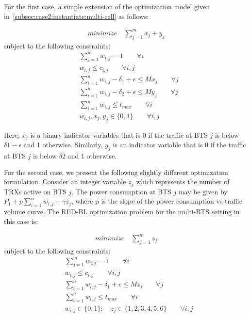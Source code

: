 For the first case, a simple extension of the optimization model given in~\ref{subsec:case2:instantiate:multi-cell} as follows:

\begin{align}
\textit{minimize} \quad \sum_{j=1}^{m} x_j + y_j
\end{align}
subject to the following constraints:
\begin{align}
& \sum_{j=1}^m w_{i,j} = 1 \qquad \forall i \\
& w_{i,j} \leq c_{i,j} \qquad \forall i, j \\
& \sum_{i=1}^nw_{i,j}-\delta_1 +\epsilon \leq Mx_j \qquad \forall j \\
& \sum_{i=1}^nw_{i,j}-\delta_2 +\epsilon \leq My_j \qquad \forall j \\
& \sum_{i=1}^n w_{i,j} \le t_{max} \qquad \forall i \\
& w_{i,j}, x_j, y_j \in \{0,1\} \qquad \forall i, j%
\end{align}

Here, $x_j$ is a binary indicator variables that is 0 if the traffic at BTS $j$ is below $\delta1 - \epsilon$ and 1 otherwise. Similarly, $y_j$ is an indicator variable that is 0 if the traffic at BTS $j$ is below $\delta2$ and 1 otherwise.

For the second case, we present the following slightly different optimization formulation. Consider an integer variable $z_j$ which represents the number of TRXs active on BTS $j$. The power consumption at BTS $j$ may be given by $P_1 + p \sum_{i=1}^{n} w_{i,j} + \gamma z_j$, where p is the slope of the power consumption vs traffic volume curve. The RED-BL optimization problem for the multi-BTS setting in this case is:

\begin{align}
\textit{minimize} \quad \sum_{j=1}^{m} z_j
\end{align}
subject to the following constraints:
\begin{align}
& \sum_{j=1}^m w_{i,j} = 1 \qquad \forall i \\
& w_{i,j} \leq c_{i,j} \qquad \forall i, j \\
& \sum_{i=1}^nw_{i,j}-\delta_1 +\epsilon \leq Mz_j \qquad \forall j \\
& \sum_{i=1}^n w_{i,j} \le t_{max} \qquad \forall i \\
& w_{i,j} \in \{0,1\}; \quad z_j \in \{1,2,3,4,5,6\}\qquad \forall i, j%
\end{align}

